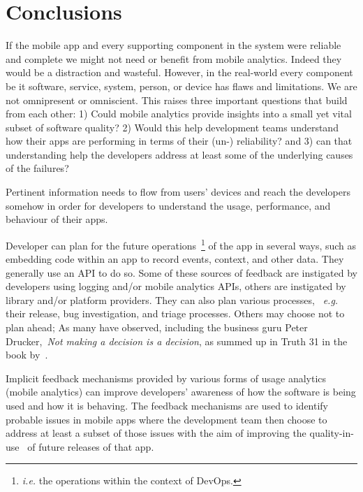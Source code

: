 \chapter{Conclusions}
\label{chapter-conclusions}



If the mobile app and every supporting component in the system were reliable and complete we might not need or benefit from mobile analytics. Indeed they would be a distraction and wasteful. However, in the real-world every component be it software, service, system, person, or device has flaws and limitations. We are not omnipresent or omniscient. 
This raises three important questions that build from each other: 1) Could mobile analytics provide insights into a small yet vital subset of software quality? 2) Would this help development teams understand how their apps are performing in terms of their (un-) reliability? and 3) can that understanding help the developers address at least some of the underlying causes of the failures?


Pertinent information needs to flow from users' devices and reach the developers somehow in order for developers to understand the usage, performance, and behaviour of their apps. 

Developer can plan for the future operations~\footnote{\emph{i.e.} the operations within the context of DevOps.} of the app in several ways, such as embedding code within an app to record events, context, and other data. They generally use an API to do so. Some of these sources of feedback are instigated by developers using logging and/or mobile analytics APIs, others are instigated by library and/or platform providers.
%
They can also plan various processes, ~\emph{e.g.} their release, bug investigation, and triage processes. Others may choose not to plan ahead; As many have observed, including the business guru Peter Drucker,~\emph{Not making a decision is a decision}, as summed up in Truth 31 in the book by~\cite{gunther2013truth_about_better_decision_making}.

Implicit feedback mechanisms provided by various forms of usage analytics (mobile analytics) can improve developers' awareness of how the software is being used and how it is behaving.  
The feedback mechanisms are used to identify probable issues in mobile apps where the development team then choose to address at least a subset of those issues with the aim of improving the quality-in-use~\citep{bevan1999_89_quality_in_use_meeting_user_needs_for_quality} of future releases of that app. 

